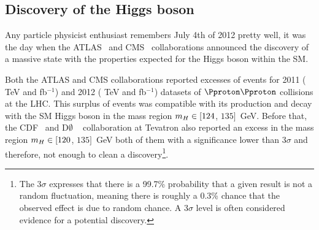 \begin{comment}
In the SM, fundamental particles acquire mass through their interactions with the Higgs fields. It is important to note that not all mass is related to the Higgs mechanism.
For instance, the mass of the proton does not came from the interaction of its components with the Higgs but from the kinetic energy of the particles that compose the proton.
\end{comment}

\subsection{Discovery of the Higgs boson}
\label{sec:Chap1:HiggsPhys_discovery}
Any particle physicist enthusiast remembers July 4th of 2012 pretty well, it was the day when 
the ATLAS~\cite{20121_ATLAS_HiggsDiscovery} 
and CMS~\cite{201230_CMS_HiggsDiscovery} collaborations
announced the discovery of a massive state \PH with the properties expected for the Higgs boson
within the SM.

Both the ATLAS and CMS collaborations reported excesses of events for 2011 ( TeV and  fb$^{-1}$) 
and 2012 ( TeV and  fb$^{-1}$) datasets of $\Pproton \Pproton$ collisions at the LHC.
This surplus of events was compatible with its production and decay with the SM Higgs boson in the
mass region $m_{H} \in [124$, $135]$~GeV. %
Before that, the CDF~\cite{CDF:2012jmx} and D$\emptyset$
~\cite{D0:2012jgw} collaboration at Tevatron also reported
an excess in the mass region $m_{H} \in [120$, $135]$~GeV both of them with a 
significance lower than $3\sigma$ and therefore, not enough to clean a discovery\footnote{The 
$3\sigma$ expresses that there is a 99.7\% probability that a given result is not a 
random fluctuation, meaning there is roughly a 0.3\% chance that the observed 
effect is due to random chance. A 3$\sigma$ level is often considered evidence for a potential discovery.}.



